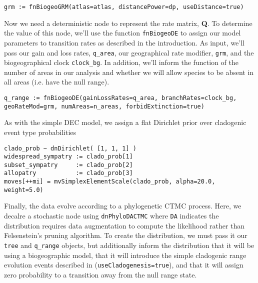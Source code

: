 \begin{snugshade}
\begin{lstlisting}
grm := fnBiogeoGRM(atlas=atlas, distancePower=dp, useDistance=true)
\end{lstlisting}
\end{snugshade}

Now we need a deterministic node to represent the rate matrix, {\bf Q}.
To determine the value of this node, we'll use the function {\tt fnBiogeoDE} to assign our model parameters to transition rates as described in the introduction.
As input, we'll pass our gain and loss rates, {\tt q\_area}, our geographical rate modifier, {\tt grm}, and the biogeographical clock {\tt clock\_bg}.
In addition, we'll inform the function of the number of areas in our analysis and whether we will allow species to be absent in all areas (i.e. have the null range).

\begin{snugshade}
\begin{lstlisting}
q_range := fnBiogeoDE(gainLossRates=q_area, branchRates=clock_bg, geoRateMod=grm, numAreas=n_areas, forbidExtinction=true)
\end{lstlisting}
\end{snugshade}

As with the simple DEC model, we assign a flat Dirichlet prior over cladogenic event type probabilities

\begin{snugshade}
\begin{lstlisting}
clado_prob ~ dnDirichlet( [1, 1, 1] )
widespread_sympatry := clado_prob[1]
subset_sympatry     := clado_prob[2]
allopatry           := clado_prob[3]
moves[++mi] = mvSimplexElementScale(clado_prob, alpha=20.0, weight=5.0)
\end{lstlisting}
\end{snugshade}

Finally, the data evolve according to a phylogenetic CTMC process. Here, we decalre a stochastic node using {\tt dnPhyloDACTMC} where {\tt DA} indicates the distribution requires data augmentation to compute the likelihood rather than Felsenstein's pruning algorithm.
To create the distribution, we must pass it our {\tt tree} and {\tt q\_range} objects, but additionally inform the distribution that it will be using a biogeographic model, that it will introduce the simple cladogenic range evolution events described in \citet{Ree2008} ({\tt useCladogenesis=true}), and that it will assign zero probability to a transition away from the null range state.

